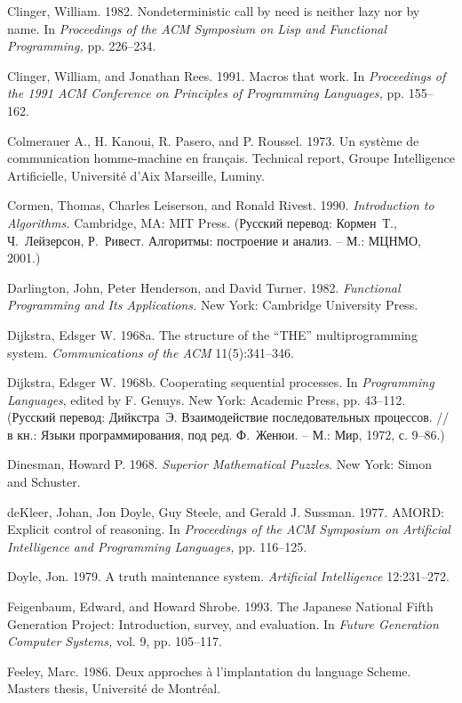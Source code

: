 {Clinger, William.  1982.  Nondeterministic call by need is neither
lazy nor by name. In {\em Proceedings of the ACM Symposium on Lisp and
Functional Programming,} pp. 226--234.

Clinger, William, and Jonathan Rees.  1991.  Macros that work.  In
{\em Proceedings of the 1991 ACM Conference on Principles of
Programming Languages,} pp. 155--162.

Colmerauer A., H. Kanoui, R. Pasero, and P. Roussel.  1973.  Un syst\`eme
de communication homme-machine en fran\c{c}ais.  Technical report,
Groupe Intelligence Artificielle, Universit\'e d'Aix Marseille,
Luminy.

Cormen, Thomas, Charles Leiserson, and Ronald Rivest.  1990. {\em
  Introduction to Algorithms.} Cam\-bridge, MA: MIT Press. (Русский
перевод: Кормен~Т., Ч.~Лейзерсон, Р.~Ривест.  Алгоритмы: построение и
анализ. -- М.: МЦНМО, 2001.)

Darlington, John, Peter Henderson, and David Turner.  1982.  
{\em Functional Pro\-gram\-ming and Its Applications.} New York: Cambridge
University Press.

Dijkstra, Edsger W. 1968a.  The structure of the ``THE''
multiprogramming system.  {\em Communications of the ACM}
11(5):341--346.

Dijkstra, Edsger W. 1968b.  Cooperating sequential processes.   
In {\em Programming Languages}, edited by F. Genuys. New York: Academic Press, 
pp. 43--112. (Русский перевод: Дийкстра~Э.  Взаимодействие последовательных
процессов. // в кн.: Языки программирования, под ред. Ф.~Женюи. -- М.:
Мир, 1972, с. 9--86.)

Dinesman, Howard P.  1968.  {\em Superior Mathematical Puzzles}.  New
York: Simon and Schuster.

deKleer, Johan, Jon Doyle, Guy Steele, and Gerald J. Sussman.  1977.
AMORD: Explicit control of reasoning.  In {\em Proceedings of the ACM
Symposium on Artificial Intelligence and Programming Languages,} pp.
116--125.

Doyle, Jon. 1979. A truth maintenance system. {\em Artificial
Intelligence} 12:231--272.

Feigenbaum, Edward, and Howard Shrobe. 1993. The Japanese National
Fifth Generation Project: Introduction, survey, and evaluation.  In {\em Future Generation Computer Systems,} vol. 9, pp. 105--117.

Feeley, Marc.  1986.  Deux approches \`a l'implantation du
language Scheme.  Masters thesis, Universit\'e de Montr\'eal.

}

